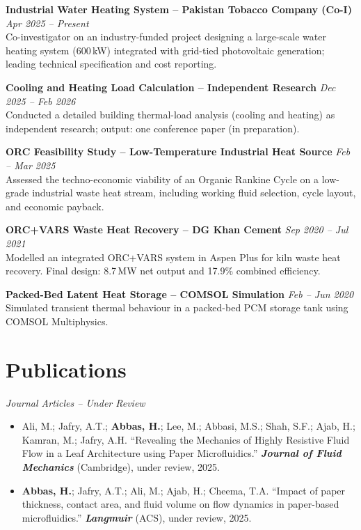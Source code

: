 \documentclass[11pt,a4paper]{article}
\begin{document}
\textbf{Industrial Water Heating System -- Pakistan Tobacco Company (Co-I)}
\hfill \textit{Apr 2025 -- Present}\\
Co-investigator on an industry-funded project designing a large-scale water
heating system (600\,kW) integrated with grid-tied photovoltaic generation;
leading technical specification and cost reporting.

\vspace{4pt}
\textbf{Cooling and Heating Load Calculation -- Independent Research}
\hfill \textit{Dec 2025 -- Feb 2026}\\
Conducted a detailed building thermal-load analysis (cooling and heating) as
independent research; output: one conference paper (in preparation).

\vspace{4pt}
\textbf{ORC Feasibility Study -- Low-Temperature Industrial Heat Source}
\hfill \textit{Feb -- Mar 2025}\\
Assessed the techno-economic viability of an Organic Rankine Cycle on a low-grade
industrial waste heat stream, including working fluid selection, cycle layout, and
economic payback.

\vspace{4pt}
\textbf{ORC+VARS Waste Heat Recovery -- DG Khan Cement}
\hfill \textit{Sep 2020 -- Jul 2021}\\
Modelled an integrated ORC+VARS system in Aspen Plus for kiln waste heat
recovery. Final design: 8.7\,MW net output and 17.9\% combined efficiency.

\vspace{4pt}
\textbf{Packed-Bed Latent Heat Storage -- COMSOL Simulation}
\hfill \textit{Feb -- Jun 2020}\\
Simulated transient thermal behaviour in a packed-bed PCM storage tank using
COMSOL Multiphysics.

\section{Publications}

\textit{Journal Articles -- Under Review}
\begin{itemize}
  \item Ali, M.; Jafry, A.T.; \textbf{Abbas, H.}; Lee, M.; Abbasi, M.S.; Shah,
        S.F.; Ajab, H.; Kamran, M.; Jafry, A.H. ``Revealing the Mechanics of
        Highly Resistive Fluid Flow in a Leaf Architecture using Paper
        Microfluidics.''
        \textbf{\textit{Journal of Fluid Mechanics}} (Cambridge), under review,
        2025.
  \item \textbf{Abbas, H.}; Jafry, A.T.; Ali, M.; Ajab, H.; Cheema, T.A.
        ``Impact of paper thickness, contact area, and fluid volume on flow
        dynamics in paper-based microfluidics.''
        \textbf{\textit{Langmuir}} (ACS), under review, 2025.
\end{itemize}
\end{document}
